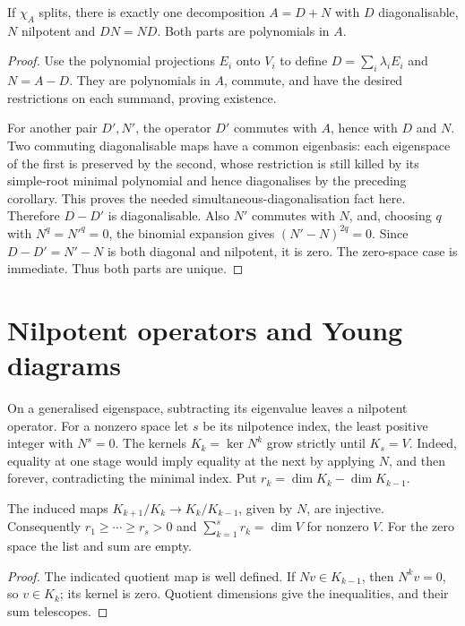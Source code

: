 \begin{theorem}\label{linear:thm:dunford}
If $\chi_A$ splits, there is exactly one decomposition $A=D+N$ with $D$ diagonalisable, $N$ nilpotent and $DN=ND$. Both parts are polynomials in $A$.
\end{theorem}
\begin{proof}
Use the polynomial projections $E_i$ onto $V_i$ to define $D=\sum_i\lambda_iE_i$ and $N=A-D$. They are polynomials in $A$, commute, and have the desired restrictions on each summand, proving existence.

For another pair $D',N'$, the operator $D'$ commutes with $A$, hence with $D$ and $N$. Two commuting diagonalisable maps have a common eigenbasis: each eigenspace of the first is preserved by the second, whose restriction is still killed by its simple-root minimal polynomial and hence diagonalises by the preceding corollary. This proves the needed simultaneous-diagonalisation fact here. Therefore $D-D'$ is diagonalisable. Also $N'$ commutes with $N$, and, choosing $q$ with $N^q=N'^q=0$, the binomial expansion gives $(N'-N)^{2q}=0$. Since $D-D'=N'-N$ is both diagonal and nilpotent, it is zero. The zero-space case is immediate. Thus both parts are unique.
\end{proof}

\section{Nilpotent operators and Young diagrams}\label{linear:sec:nilpotent}

On a generalised eigenspace, subtracting its eigenvalue leaves a nilpotent operator. For a nonzero space let $s$ be its nilpotence index, the least positive integer with $N^s=0$. The kernels $K_k=\ker N^k$ grow strictly until $K_s=V$. Indeed, equality at one stage would imply equality at the next by applying $N$, and then forever, contradicting the minimal index. Put $r_k=\dim K_k-\dim K_{k-1}$.

\begin{lemma}\label{linear:lem:decreasing}
The induced maps $K_{k+1}/K_k\to K_k/K_{k-1}$, given by $N$, are injective. Consequently $r_1\ge\cdots\ge r_s>0$ and $\sum_{k=1}^sr_k=\dim V$ for nonzero $V$. For the zero space the list and sum are empty.
\end{lemma}
\begin{proof}
The indicated quotient map is well defined. If $Nv\in K_{k-1}$, then $N^kv=0$, so $v\in K_k$; its kernel is zero. Quotient dimensions give the inequalities, and their sum telescopes.
\end{proof}

